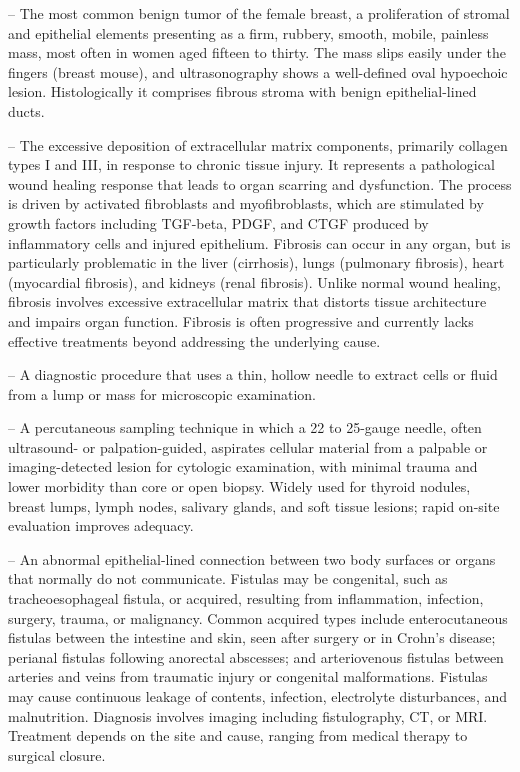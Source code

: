 -- The most common benign tumor of the female breast, a proliferation of stromal and epithelial elements presenting as a firm, rubbery, smooth, mobile, painless mass, most often in women aged fifteen to thirty. The mass slips easily under the fingers (breast mouse), and ultrasonography shows a well-defined oval hypoechoic lesion. Histologically it comprises fibrous stroma with benign epithelial-lined ducts.

-- The excessive deposition of extracellular matrix components, primarily collagen types I and III, in response to chronic tissue injury. It represents a pathological wound healing response that leads to organ scarring and dysfunction. The process is driven by activated fibroblasts and myofibroblasts, which are stimulated by growth factors including TGF-beta, PDGF, and CTGF produced by inflammatory cells and injured epithelium. Fibrosis can occur in any organ, but is particularly problematic in the liver (cirrhosis), lungs (pulmonary fibrosis), heart (myocardial fibrosis), and kidneys (renal fibrosis). Unlike normal wound healing, fibrosis involves excessive extracellular matrix that distorts tissue architecture and impairs organ function. Fibrosis is often progressive and currently lacks effective treatments beyond addressing the underlying cause.

-- A diagnostic procedure that uses a thin, hollow needle to extract cells or fluid from a lump or mass for microscopic examination.

-- A percutaneous sampling technique in which a 22 to 25-gauge needle, often ultrasound- or palpation-guided, aspirates cellular material from a palpable or imaging-detected lesion for cytologic examination, with minimal trauma and lower morbidity than core or open biopsy. Widely used for thyroid nodules, breast lumps, lymph nodes, salivary glands, and soft tissue lesions; rapid on-site evaluation improves adequacy.

-- An abnormal epithelial-lined connection between two body surfaces or organs that normally do not communicate. Fistulas may be congenital, such as tracheoesophageal fistula, or acquired, resulting from inflammation, infection, surgery, trauma, or malignancy. Common acquired types include enterocutaneous fistulas between the intestine and skin, seen after surgery or in Crohn's disease; perianal fistulas following anorectal abscesses; and arteriovenous fistulas between arteries and veins from traumatic injury or congenital malformations. Fistulas may cause continuous leakage of contents, infection, electrolyte disturbances, and malnutrition. Diagnosis involves imaging including fistulography, CT, or MRI. Treatment depends on the site and cause, ranging from medical therapy to surgical closure.

